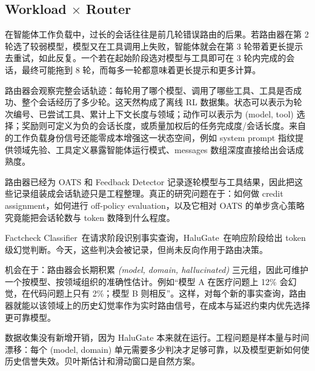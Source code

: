 \subsection{Workload $\times$ Router}

\begin{opportunity}[面向最短会话长度路由的离线 RL]
\label{opp:session-cascade}
在智能体工作负载中，过长的会话往往是前几轮错误路由的后果。若路由器在第 2 轮选了较弱模型，模型又在工具调用上失败，智能体就会在第 3 轮带着更长提示去重试，如此反复。一个若在起始阶段选对模型与工具即可在 3 轮内完成的会话，最终可能拖到 8 轮，而每多一轮都意味着更长提示和更多计算。

路由器会观察完整会话轨迹：每轮用了哪个模型、调用了哪些工具、工具是否成功、整个会话经历了多少轮。这天然构成了离线 RL 数据集。状态可以表示为轮次编号、已尝试工具、累计上下文长度与领域；动作可以表示为 (model, tool) 选择；奖励则可定义为负的会话长度，或质量加权后的任务完成度/会话长度。来自  的工作负载身份信号还能零成本增强这一状态空间，例如 system prompt 指纹提供领域先验、工具定义暴露智能体运行模式、messages 数组深度直接给出会话成熟度。

\begin{frisk}
路由器已经为 OATS 和 Feedback Detector 记录逐轮模型与工具结果，因此把这些记录组装成会话轨迹只是工程整理。真正的研究问题在于：如何做 credit assignment，如何进行 off-policy evaluation，以及它相对 OATS 的单步贪心策略究竟能把会话轮数与 token 数降到什么程度。
\end{frisk}
\end{opportunity}

\begin{opportunity}
\label{opp:halugate-reputation}
Factcheck Classifier~\cite{factcheck2026}在请求阶段识别事实查询，HaluGate~\cite{halugate2025}在响应阶段给出 token 级幻觉判断。今天，这些判决会被记录，但尚未反向作用于路由决策。

机会在于：路由器会长期积累 \emph{(model, domain, hallucinated)} 三元组，因此可维护一个按模型、按领域组织的准确性估计。例如“模型 A 在医疗问题上 12\% 会幻觉，在代码问题上只有 2\%；模型 B 则相反”。这样，对每个新的事实查询，路由器就能以该领域上的历史幻觉率作为实时路由信号，在成本与延迟约束内优先选择更可靠模型。

\begin{frisk}
数据收集没有新增开销，因为 HaluGate 本来就在运行。工程问题是样本量与时间漂移：每个 (model, domain) 单元需要多少判决才足够可靠，以及模型更新如何使历史信誉失效。贝叶斯估计和滑动窗口是自然方案。
\end{frisk}
\end{opportunity}

